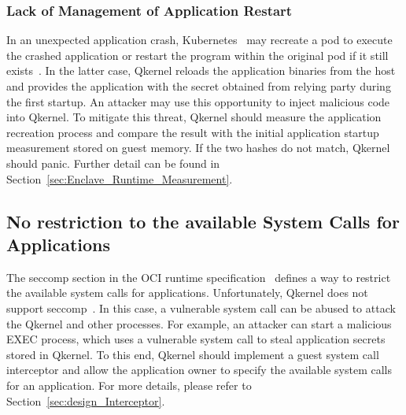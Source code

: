 \subsubsection{Lack of Management of Application Restart}
In an unexpected application crash, Kubernetes~\cite*{k8s} may recreate a pod to execute the crashed application or restart the program within the original pod if it still exists~\cite*{k8s}. In the latter case, Qkernel reloads the application binaries from the host and provides the application with the secret 
obtained from relying party during the first startup. An attacker may use this opportunity to inject malicious code into Qkernel. To mitigate this threat, Qkernel should measure the application recreation process and compare the result with the initial 
application startup measurement stored on guest memory. If the two hashes do not match, Qkernel should panic.  Further detail can be found in Section~\ref{sec:Enclave_Runtime_Measurement}. 

\subsection{No restriction to the available System Calls for Applications}
The seccomp section in the OCI runtime specification~\cite*{oci-runtime-spec} defines a way to restrict the available system calls for applications. Unfortunately, Qkernel does not support seccomp~\cite*{seccomp}. 
In this case, a vulnerable system call can be abused to attack the Qkernel and other processes. 
For example, an attacker can start a malicious EXEC process, which uses a vulnerable system call to steal application secrets stored in Qkernel. To this end, Qkernel should implement a guest system call interceptor and allow the application owner to specify the available system calls for an application. For more details, please refer to 
Section~\ref{sec:design_Interceptor}. 

